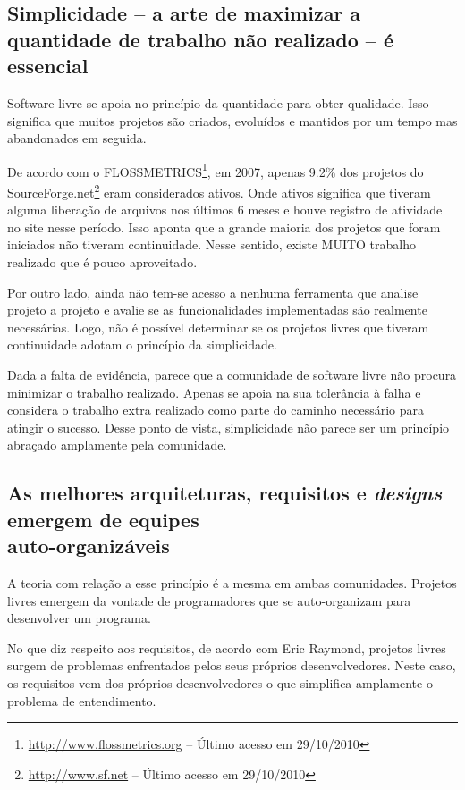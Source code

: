 \subsection[Simplicidade é essencial]{Simplicidade -- a arte de
  maximizar a quantidade de trabalho não realizado -- é essencial}

Software livre se apoia no princípio da quantidade para obter
qualidade. Isso significa que muitos projetos são criados, evoluídos e
mantidos por um tempo mas abandonados em seguida.

De acordo com o
FLOSSMETRICS\footnote{\url{http://www.flossmetrics.org} -- Último
  acesso em 29/10/2010}, em 2007, apenas 9.2\% dos projetos do
SourceForge.net\footnote{\url{http://www.sf.net} -- Último acesso em
  29/10/2010} eram considerados ativos. Onde ativos significa que
tiveram alguma liberação de arquivos nos últimos 6 meses e houve
registro de atividade no site nesse período. Isso aponta que a grande
maioria dos projetos que foram iniciados não tiveram
continuidade. Nesse sentido, existe MUITO trabalho realizado que é
pouco aproveitado.

Por outro lado, ainda não tem-se acesso a nenhuma ferramenta que
analise projeto a projeto e avalie se as funcionalidades implementadas
são realmente necessárias. Logo, não é possível determinar se os
projetos livres que tiveram continuidade adotam o princípio da
simplicidade.

Dada a falta de evidência, parece que a comunidade de software livre
não procura minimizar o trabalho realizado. Apenas se apoia na sua
tolerância à falha e considera o trabalho extra realizado como parte
do caminho necessário para atingir o sucesso. Desse ponto de vista,
simplicidade não parece ser um princípio abraçado amplamente pela
comunidade.

\subsection[Equipes auto-organizáveis]{As melhores arquiteturas,
  requisitos e \textit{designs} emergem de equipes\\auto-organizáveis}

A teoria com relação a esse princípio é a mesma em ambas
comunidades. Projetos livres emergem da vontade de programadores que
se auto-organizam para desenvolver um programa.

No que diz respeito aos requisitos, de acordo com Eric Raymond,
projetos livres surgem de problemas enfrentados pelos seus próprios
desenvolvedores. Neste caso, os requisitos vem dos próprios
desenvolvedores o que simplifica amplamente o problema de
entendimento.


